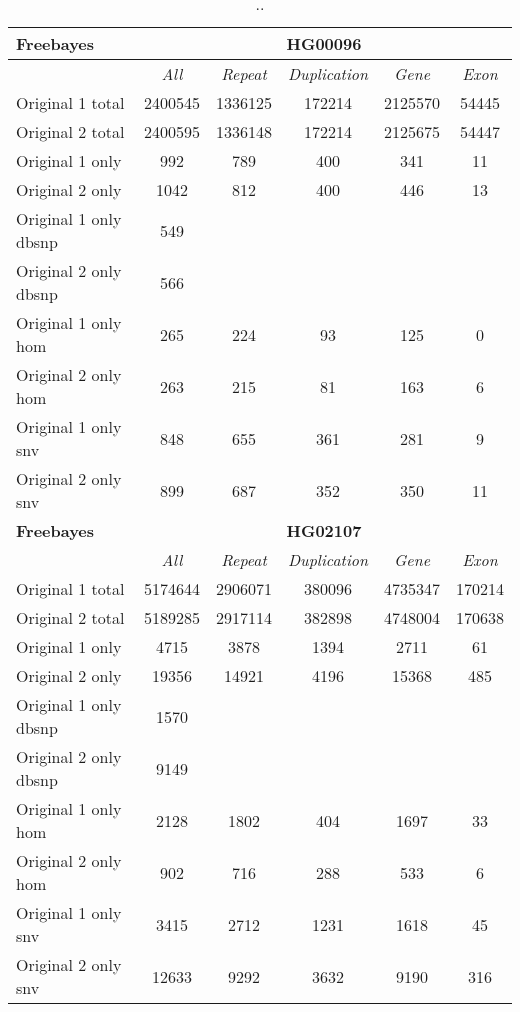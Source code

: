 \begin{table}[htb]
\begin{center}
\begin{tabular}{|l|c||c|c|c|c|}
\hline
{\bf Freebayes} & \multicolumn{5}{|c|}{\bf HG00096} \\
\hline
\cline{2-6}
{\bf} & {\it All} & {\it Repeat} & {\it Duplication} & {\it Gene} & {\it Exon} \\
\hline
Original 1 total & 2400545 & 1336125 & 172214 & 2125570 & 54445\\ 
\hline
Original 2 total & 2400595 & 1336148 & 172214 & 2125675 & 54447\\ 
\hline
Original 1 only & 992 & 789 & 400 & 341 & 11\\ 
\hline
Original 2 only & 1042 & 812 & 400 & 446 & 13\\ 
\hline
Original 1 only dbsnp & 549 &  &  &  & \\ 
\hline
Original 2 only dbsnp & 566 &  &  &  & \\ 
\hline
Original 1 only hom & 265 & 224 & 93 & 125 & 0\\ 
\hline
Original 2 only hom & 263 & 215 & 81 & 163 & 6\\ 
\hline
Original 1 only snv & 848 & 655 & 361 & 281 & 9\\ 
\hline
Original 2 only snv & 899 & 687 & 352 & 350 & 11\\ 
\hline
\hline
{\bf Freebayes} & \multicolumn{5}{|c|}{\bf HG02107} \\
\hline
\cline{2-6}
{\bf} & {\it All} & {\it Repeat} & {\it Duplication} & {\it Gene} & {\it Exon} \\
\hline
Original 1 total & 5174644 & 2906071 & 380096 & 4735347 & 170214\\ 
\hline
Original 2 total & 5189285 & 2917114 & 382898 & 4748004 & 170638\\ 
\hline
Original 1 only & 4715 & 3878 & 1394 & 2711 & 61\\ 
\hline
Original 2 only & 19356 & 14921 & 4196 & 15368 & 485\\ 
\hline
Original 1 only dbsnp & 1570 &  &  &  & \\ 
\hline
Original 2 only dbsnp & 9149 &  &  &  & \\ 
\hline
Original 1 only hom & 2128 & 1802 & 404 & 1697 & 33\\ 
\hline
Original 2 only hom & 902 & 716 & 288 & 533 & 6\\ 
\hline
Original 1 only snv & 3415 & 2712 & 1231 & 1618 & 45\\ 
\hline
Original 2 only snv & 12633 & 9292 & 3632 & 9190 & 316\\  
\hline
\end{tabular}
\end{center}
\caption{ .. }
\label{tab:orig-vs-shuf-freebayes}
\end{table}

